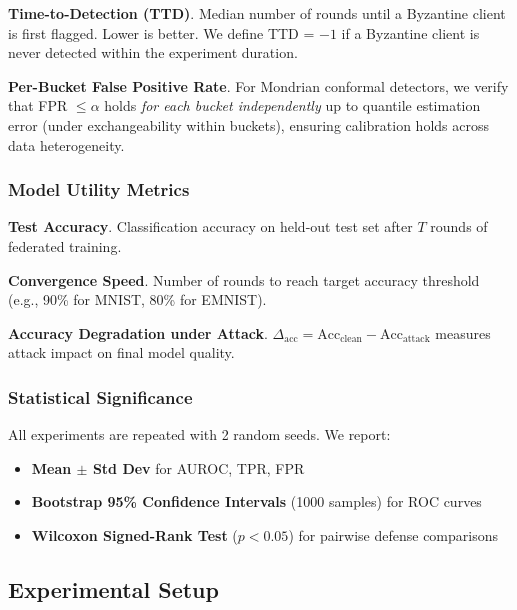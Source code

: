 \textbf{Time-to-Detection (TTD)}. Median number of rounds until a Byzantine client is first flagged. Lower is better. We define TTD = $-1$ if a Byzantine client is never detected within the experiment duration.

\textbf{Per-Bucket False Positive Rate}. For Mondrian conformal detectors, we verify that FPR $\leq \alpha$ holds \textit{for each bucket independently} up to quantile estimation error (under exchangeability within buckets), ensuring calibration holds across data heterogeneity.

\subsubsection{Model Utility Metrics}

\textbf{Test Accuracy}. Classification accuracy on held-out test set after $T$ rounds of federated training.

\textbf{Convergence Speed}. Number of rounds to reach target accuracy threshold (e.g., 90\% for MNIST, 80\% for EMNIST).

\textbf{Accuracy Degradation under Attack}. $\Delta_{\text{acc}} = \text{Acc}_{\text{clean}} - \text{Acc}_{\text{attack}}$ measures attack impact on final model quality.

\subsubsection{Statistical Significance}

All experiments are repeated with 2 random seeds. We report:
\begin{itemize}[leftmargin=*,noitemsep]
    \item \textbf{Mean $\pm$ Std Dev} for AUROC, TPR, FPR
    \item \textbf{Bootstrap 95\% Confidence Intervals} (1000 samples) for ROC curves
    \item \textbf{Wilcoxon Signed-Rank Test} ($p < 0.05$) for pairwise defense comparisons
\end{itemize}


\subsection{Experimental Setup}
\label{sec:experimental_setup}

